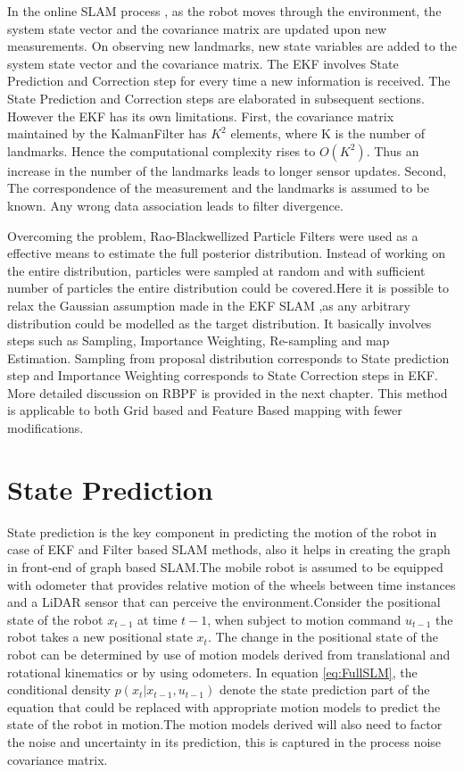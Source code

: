 In the online SLAM process , as the robot moves through the environment, the system state vector and the covariance matrix are updated upon new measurements. 
On observing new landmarks, new state variables are added to the system state vector and the covariance matrix. The EKF involves State Prediction and Correction step for every time a new information is received. The State Prediction and Correction steps are elaborated in subsequent sections. However the EKF has its own limitations. First, the covariance matrix maintained by the KalmanFilter has $K^2$ elements, where K is the number of landmarks. Hence the computational complexity rises to ${O}(K^2)$. Thus an increase in the number of the landmarks leads to longer sensor updates. Second, The correspondence of the measurement and the landmarks is assumed to be known. Any wrong data association leads to filter divergence.  \par
Overcoming the problem, Rao-Blackwellized Particle Filters were used as a effective means to estimate the full posterior distribution. Instead of working on the entire distribution, particles were sampled at random and with sufficient number of particles the entire distribution could be covered.Here it is possible to relax the Gaussian assumption made in the EKF SLAM ,as any arbitrary distribution could be modelled as the target distribution. It basically involves steps such as Sampling, Importance Weighting, Re-sampling and map Estimation. Sampling from proposal distribution corresponds to State prediction step and Importance Weighting corresponds to State Correction steps in EKF. More detailed discussion on RBPF is provided in the next chapter. This method is applicable to both Grid based and Feature Based mapping with fewer modifications.\par


\section{State Prediction}
State prediction is the key component in predicting the motion of the robot in case of EKF and Filter based SLAM methods, also it helps in creating the graph in front-end of graph based SLAM.The mobile robot is assumed to be equipped with odometer that provides relative motion of the wheels between time instances and a LiDAR sensor that can perceive the environment.Consider the positional state of the robot $x_{t-1}$ at time $t-1$, when subject to motion command $u_{t-1}$ the robot takes a new positional state $x_t$. The change in the positional state of the robot can be determined by use of motion models derived from translational and rotational kinematics or by using odometers. In equation \ref{eq:FullSLM}, the conditional density $p(x_t| x_{t-1}, u_{t-1})$ denote the state prediction part of the equation that could be replaced with appropriate motion models to predict the state of the robot in motion.The motion models derived will also need to factor the noise and uncertainty in its prediction, this is captured in the process noise covariance matrix. 

